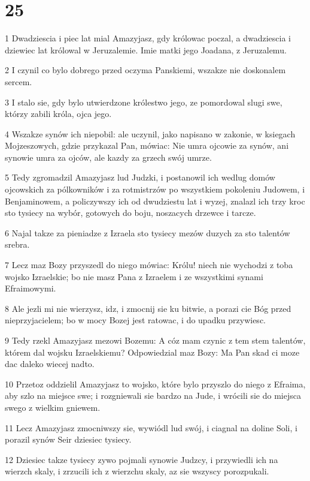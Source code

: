 \chapter{25}

\par 1 Dwadziescia i piec lat mial Amazyjasz, gdy królowac poczal, a dwadziescia i dziewiec lat królowal w Jeruzalemie. Imie matki jego Joadana, z Jeruzalemu.
\par 2 I czynil co bylo dobrego przed oczyma Panskiemi, wszakze nie doskonalem sercem.
\par 3 I stalo sie, gdy bylo utwierdzone królestwo jego, ze pomordowal slugi swe, którzy zabili króla, ojca jego.
\par 4 Wszakze synów ich niepobil: ale uczynil, jako napisano w zakonie, w ksiegach Mojzeszowych, gdzie przykazal Pan, mówiac: Nie umra ojcowie za synów, ani synowie umra za ojców, ale kazdy za grzech swój umrze.
\par 5 Tedy zgromadzil Amazyjasz lud Judzki, i postanowil ich wedlug domów ojcowskich za pólkowników i za rotmistrzów po wszystkiem pokoleniu Judowem, i Benjaminowem, a policzywszy ich od dwudziestu lat i wyzej, znalazl ich trzy kroc sto tysiecy na wybór, gotowych do boju, noszacych drzewce i tarcze.
\par 6 Najal takze za pieniadze z Izraela sto tysiecy mezów duzych za sto talentów srebra.
\par 7 Lecz maz Bozy przyszedl do niego mówiac: Królu! niech nie wychodzi z toba wojsko Izraelskie; bo nie masz Pana z Izraelem i ze wszystkimi synami Efraimowymi.
\par 8 Ale jezli mi nie wierzysz, idz, i zmocnij sie ku bitwie, a porazi cie Bóg przed nieprzyjacielem; bo w mocy Bozej jest ratowac, i do upadku przywiesc.
\par 9 Tedy rzekl Amazyjasz mezowi Bozemu: A cóz mam czynic z tem stem talentów, którem dal wojsku Izraelskiemu? Odpowiedzial maz Bozy: Ma Pan skad ci moze dac daleko wiecej nadto.
\par 10 Przetoz oddzielil Amazyjasz to wojsko, które bylo przyszlo do niego z Efraima, aby szlo na miejsce swe; i rozgniewali sie bardzo na Jude, i wrócili sie do miejsca swego z wielkim gniewem.
\par 11 Lecz Amazyjasz zmocniwszy sie, wywiódl lud swój, i ciagnal na doline Soli, i porazil synów Seir dziesiec tysiecy.
\par 12 Dziesiec takze tysiecy zywo pojmali synowie Judzcy, i przywiedli ich na wierzch skaly, i zrzucili ich z wierzchu skaly, az sie wszyscy porozpukali.

